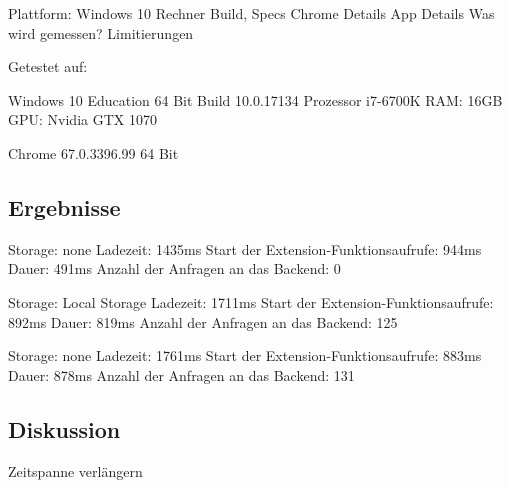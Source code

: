 Plattform: Windows 10 Rechner Build, Specs
Chrome Details
App Details
Was wird gemessen?
Limitierungen

Getestet auf:

Windows 10 Education 64 Bit
Build 10.0.17134
Prozessor i7-6700K
RAM: 16GB
GPU: Nvidia GTX 1070

Chrome  67.0.3396.99 64 Bit

\subsection{Ergebnisse}
\label{ss:ergebnisseht2}

Storage: none
Ladezeit: 1435ms
Start der Extension-Funktionsaufrufe: 944ms
Dauer: 491ms
Anzahl der Anfragen an das Backend: 0


Storage: Local Storage
Ladezeit: 1711ms
Start der Extension-Funktionsaufrufe: 892ms
Dauer: 819ms
Anzahl der Anfragen an das Backend: 125


Storage: none
Ladezeit: 1761ms
Start der Extension-Funktionsaufrufe: 883ms
Dauer: 878ms
Anzahl der Anfragen an das Backend: 131




\subsection{Diskussion}
\label{ss:diskussionht2}

Zeitspanne verlängern